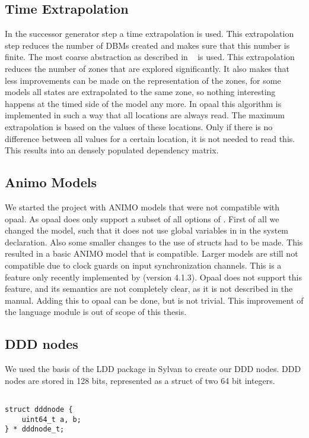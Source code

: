 \subsection{Time Extrapolation}
In the successor generator step a time extrapolation is used. This extrapolation step reduces the number of DBMs created and makes sure that this number is finite. The most coarse abstraction as described in ~\cite{Behrmann2004} is used. This extrapolation reduces the number of zones that are explored significantly. It also makes that less improvements can be made on the representation of the zones, for some models all states are extrapolated to the same zone, so nothing interesting happens at the timed side of the model any more. In opaal this algorithm is implemented in such a way that all \uppaal{} locations are always read. The maximum extrapolation is based on the values of these locations. Only if there is no difference between all values for a certain location, it is not needed to read this. This results into an densely populated dependency matrix. 

\subsection{Animo Models}
We started the project with ANIMO models that were not compatible with opaal. As opaal does only support a subset of all options of \uppaal{}. First of all we changed the model, such that it does not use global variables in in the system declaration. Also some smaller changes to the use of structs had to be made. This resulted in a basic ANIMO model that is compatible. Larger models are still not compatible due to clock guards on input synchronization channels. This is a feature only recently implemented by \uppaal{}(version 4.1.3). Opaal does not support this feature, and its semantics are not completely clear, as it is not described in the manual. Adding this to opaal can be done, but is not trivial. This improvement of the language module is out of scope of this thesis.  

\subsection{DDD nodes}
We used the basis of the LDD package in Sylvan to create our DDD nodes. DDD nodes are stored in 128 bits, represented as a struct of two 64 bit integers.  

\begin{lstlisting} 

struct dddnode {
    uint64_t a, b;
} * dddnode_t; 
\end{lstlisting}

